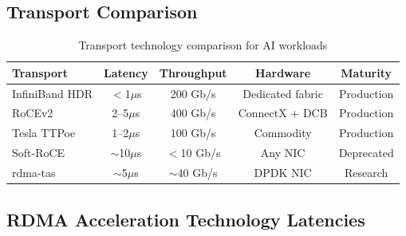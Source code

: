 \documentclass[10pt,letterpaper]{article}
\begin{document}
\subsection{Transport Comparison}

\begin{table}[H]
\centering
\small
\begin{tabular}{@{}lcccc@{}}
\toprule
\textbf{Transport} & \textbf{Latency} & \textbf{Throughput} & \textbf{Hardware} & \textbf{Maturity} \\
\midrule
InfiniBand HDR & $<$1$\mu$s & 200 Gb/s & Dedicated fabric & Production \\
RoCEv2 & 2--5$\mu$s & 400 Gb/s & ConnectX + DCB & Production \\
Tesla TTPoe & 1--2$\mu$s & 100 Gb/s & Commodity & Production \\
Soft-RoCE & $\sim$10$\mu$s & $<$10 Gb/s & Any NIC & Deprecated \\
rdma-tas & $\sim$5$\mu$s & $\sim$40 Gb/s & DPDK NIC & Research \\
\bottomrule
\end{tabular}
\caption{Transport technology comparison for AI workloads}
\end{table}

\subsection{RDMA Acceleration Technology Latencies}
\end{document}
